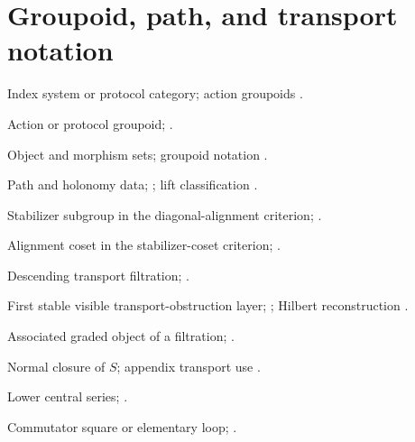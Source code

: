 \section*{Groupoid, path, and transport notation}
\begin{description}[leftmargin=4.1cm,style=nextline,itemsep=0.2em,before=\raggedright]
\item[\(\mathcal I\)]
Index system or protocol category; action groupoids .
\item[\(\mathcal G(\mathcal I)\), \(\GI\)]
Action or protocol groupoid; .
\item[\(\Ob,\Mor\)]
Object and morphism sets; groupoid notation .
\item[\(\Path,\Hol\)]
Path and holonomy data; ; lift classification
.
\item[\(H_k=\Stab(x_k)\)]
Stabilizer subgroup in the diagonal-alignment criterion;
.
\item[\(C_k\)]
Alignment coset in the stabilizer-coset criterion; .
\item[\(F^k\)]
Descending transport filtration; .
\item[\(F^2/F^3\)]
First stable visible transport-obstruction layer; ;
Hilbert reconstruction .
\item[\(\gr\)]
Associated graded object of a filtration; .
\item[\(\ncl{S}\)]
Normal closure of \(S\); appendix transport use .
\item[\(\gamma_i(G)\)]
Lower central series; .
\item[\(\square_{ij}\)]
Commutator square or elementary loop; .
\end{description}

